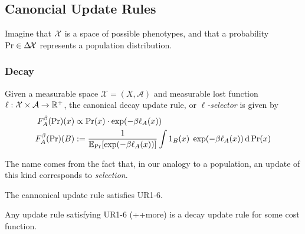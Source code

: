 \documentclass{article}
\begin{document}
\subsection{Canoncial Update Rules}
Imagine that $\mathcal X$ is a space of possible phenotypes, and that a probability $\Pr \in \Delta\!\mathcal X$ represents a population distribution.

\subsubsection{Decay}
Given a measurable space $\mathcal X = (X, \mathcal A)$ and measurable lost function\\
$\ell: \mathcal X\times\mathcal A \to \mathbb R^+$, the
canonical decay update rule, or \emph{$\ell$-selector} is given by
\def\cost#1#2{\ell_{#2}(#1)}
\begin{align*}
    F^\beta_A(\Pr)(x) &\propto \Pr(x) \cdot \exp(-\beta \cost xA) \\
    F^\beta_A(\Pr)(B) &:=  \frac{1}{\Ex_{\Pr}[\exp(-\beta \cost xA )]}
        \int 1_B(x) \; \exp(-\beta \cost xA ) \,\mathrm d\Pr(x)
\end{align*}

The name comes from the fact that, in our analogy to a population, an update of this kind corresponds to \emph{selection}.




\begin{prop}
    The cannonical update rule satisfies UR1-6.
\end{prop}




\begin{conj}
    Any update rule satisfying UR1-6 (++more) is a decay update rule for some cost function.
\end{conj}
\end{document}
